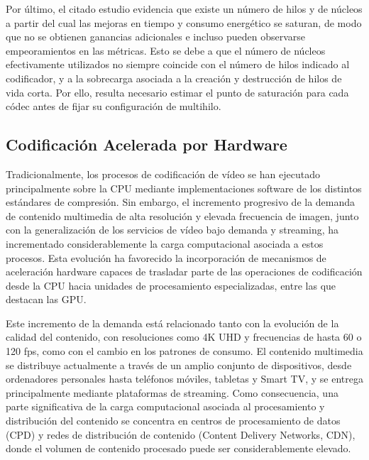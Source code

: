   Por último, el citado estudio \cite{multithread-energy-consumption-videoencoding} evidencia que existe un número de hilos y de núcleos a partir del cual las mejoras en tiempo y consumo energético se saturan, de modo que no se obtienen ganancias adicionales e incluso pueden observarse empeoramientos en las métricas. Esto se debe a que el número de núcleos efectivamente utilizados no siempre coincide con el número de hilos indicado al codificador, y a la sobrecarga asociada a la creación y destrucción de hilos de vida corta. Por ello, resulta necesario estimar el punto de saturación para cada códec antes de fijar su configuración de multihilo. 

  
\subsection{Codificación Acelerada por Hardware}

 Tradicionalmente, los procesos de codificación de vídeo se han ejecutado principalmente sobre la CPU mediante implementaciones software de los distintos estándares de compresión. Sin embargo, el incremento progresivo de la demanda de contenido multimedia de alta resolución y elevada frecuencia de imagen, junto con la generalización de los servicios de vídeo bajo demanda y streaming, ha incrementado considerablemente la carga computacional asociada a estos procesos. Esta evolución ha favorecido la incorporación de mecanismos de aceleración hardware capaces de trasladar parte de las operaciones de codificación desde la CPU hacia unidades de procesamiento especializadas, entre las que destacan las GPU.

 Este incremento de la demanda está relacionado tanto con la evolución de la calidad del contenido, con resoluciones como 4K UHD y frecuencias de hasta 60 o 120 fps, como con el cambio en los patrones de consumo. El contenido multimedia se distribuye actualmente a través de un amplio conjunto de dispositivos, desde ordenadores personales hasta teléfonos móviles, tabletas y Smart TV, y se entrega principalmente mediante plataformas de streaming. Como consecuencia, una parte significativa de la carga computacional asociada al procesamiento y distribución del contenido se concentra en centros de procesamiento de datos (CPD) y redes de distribución de contenido (Content Delivery Networks, CDN), donde el volumen de contenido procesado puede ser considerablemente elevado.
 
